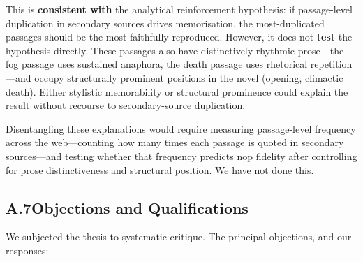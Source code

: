 This is \textbf{consistent with} the analytical reinforcement
hypothesis: if passage-level duplication in secondary sources drives
memorisation, the most-duplicated passages should be the most
faithfully reproduced.  However, it does not \textbf{test} the
hypothesis directly.  These passages also have distinctively rhythmic
prose---the fog passage uses sustained anaphora, the death passage
uses rhetorical repetition---and occupy structurally prominent
positions in the novel (opening, climactic death).  Either stylistic
memorability or structural prominence could explain the result without
recourse to secondary-source duplication.

Disentangling these explanations would require measuring passage-level
frequency across the web---counting how many times each passage is
quoted in secondary sources---and testing whether that frequency
predicts nop fidelity after controlling for prose distinctiveness and
structural position.  We have not done this.

\subsection*{A.7\quad Objections and Qualifications}
\addtocounter{subsection}{1}

We subjected the thesis to systematic critique.  The principal
objections, and our responses:

